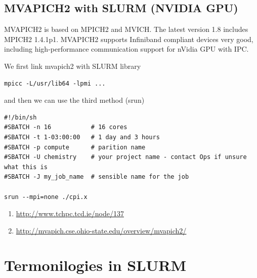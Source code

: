 \subsection{MVAPICH2 with SLURM (NVIDIA GPU)}

MVAPICH2 is based on MPICH2 and MVICH. The latest version 1.8 includes MPICH2
1.4.1p1. MVAPICH2 supports Infiniband compliant devices very good, including
high-performance communication support for nVidia GPU with IPC.

We first link mvapich2 with SLURM library
\begin{verbatim}
mpicc -L/usr/lib64 -lpmi ...
\end{verbatim}
and then we can use the third method (srun)
\begin{verbatim}
#!/bin/sh
#SBATCH -n 16           # 16 cores
#SBATCH -t 1-03:00:00   # 1 day and 3 hours
#SBATCH -p compute      # parition name
#SBATCH -U chemistry    # your project name - contact Ops if unsure what this is
#SBATCH -J my_job_name  # sensible name for the job

srun --mpi=none ./cpi.x
\end{verbatim}

\begin{enumerate}
  \item \url{http://www.tchpc.tcd.ie/node/137}
   
  \item \url{http://mvapich.cse.ohio-state.edu/overview/mvapich2/}
\end{enumerate}

\section{Termonilogies in SLURM}
\label{sec:SLURM-term_partition}
\label{sec:SLURM-term_task}

